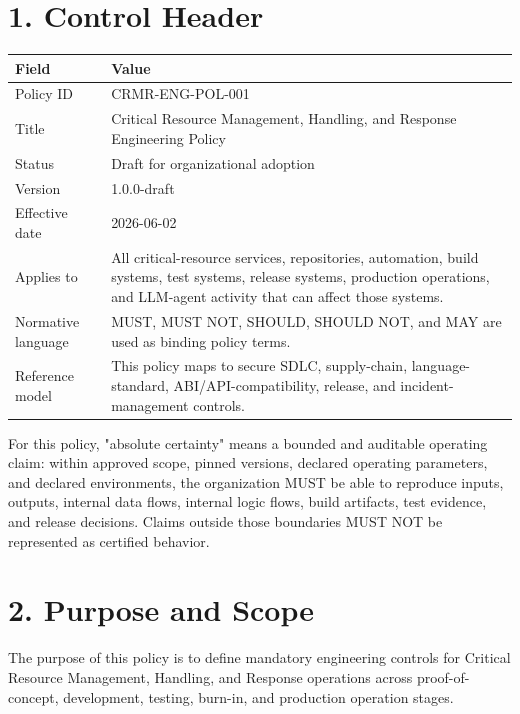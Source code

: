 \documentclass[11pt]{article}
\begin{document}
\section*{1. Control Header}
\begin{longtable}{|p{}|p{}|}
\hline
Field & Value \\ \hline
Policy ID & CRMR-ENG-POL-001 \\ \hline
Title & Critical Resource Management, Handling, and Response Engineering Policy \\ \hline
Status & Draft for organizational adoption \\ \hline
Version & 1.0.0-draft \\ \hline
Effective date & 2026-06-02 \\ \hline
Applies to & All critical-resource services, repositories, automation, build systems, test systems, release systems, production operations, and LLM-agent activity that can affect those systems. \\ \hline
Normative language & MUST, MUST NOT, SHOULD, SHOULD NOT, and MAY are used as binding policy terms. \\ \hline
Reference model & This policy maps to secure SDLC, supply-chain, language-standard, ABI/API-compatibility, release, and incident-management controls. \\ \hline
\end{longtable}
For this policy, "absolute certainty" means a bounded and auditable operating claim: within approved scope, pinned versions, declared operating parameters, and declared environments, the organization MUST be able to reproduce inputs, outputs, internal data flows, internal logic flows, build artifacts, test evidence, and release decisions. Claims outside those boundaries MUST NOT be represented as certified behavior.


\hypertarget{sec-purpose-scope}{}
\section*{2. Purpose and Scope}
The purpose of this policy is to define mandatory engineering controls for Critical Resource Management, Handling, and Response operations across proof-of-concept, development, testing, burn-in, and production operation stages.
\end{document}
